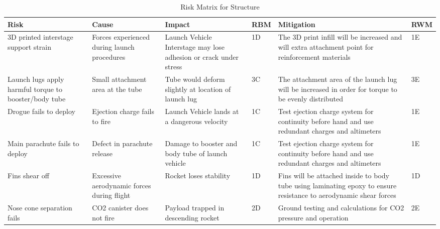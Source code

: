     \begin{table}[]
    \label{vertical unfolding arms}
    {\footnotesize
    \caption{Risk Matrix for Structure}
    \centering
    \begin{tabularx}{\linewidth}{XXXlXl}
    \toprule
    \textbf{Risk}                                            & \textbf{Cause}                                                                                                                 & \textbf{Impact}                                                                                                                           & \textbf{RBM}  & \textbf{Mitigation}                                                                                                                                                                                     & \textbf{RWM} \\ \midrule
    3D printed interstage support strain & Forces experienced during launch procedures & Launch Vehicle Interstage may lose adhesion or crack under stress & \cellcolor{orange!25} 1D & The 3D print infill will be increased and will extra attachment point for reinforcement materials & \cellcolor{green!25} 1E \\
    Launch lugs apply harmful torque to booster/body tube & Small attachment area at the tube & Tube would deform slightly at location of launch lug & \cellcolor{orange!25} 3C & The attachment area of the launch lug will be increased in order for torque to be evenly distributed & \cellcolor{green!25} 3E \\
    Drogue fails to deploy & Ejection charge fails to fire & Launch Vehicle lands at a dangerous velocity & \cellcolor{red!25} 1C & Test ejection charge system for continuity before hand and use redundant charges and altimeters & \cellcolor{green!25} 1E \\
    Main parachute fails to deploy & Defect in parachute release & Damage to booster and body tube of launch vehicle & \cellcolor{red!25} 1C & Test ejection charge system for continuity before hand and use redundant charges and altimeters & \cellcolor{green!25} 1E \\ \midrule
    Fins shear off & Excessive aerodynamic forces during flight & Rocket loses stability & \cellcolor{orange!25} 1D & Fins will be attached inside to body tube using laminating epoxy to ensure resistance to aerodynamic shear forces & \cellcolor{orange!25} 1D \\
    Nose cone separation fails & CO2 canister does not fire & Payload trapped in descending rocket & \cellcolor{orange!25} 2D & Ground testing and calculations for CO2 pressure and operation & \cellcolor{green!25} 2E \\

\end{tabularx}}
\end{table}
